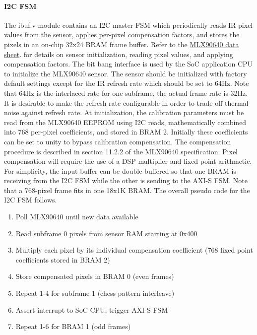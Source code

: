 \paragraph{I2C FSM}
The ibuf.v module contains an I2C master FSM which periodically reads IR pixel
values from the sensor, applies per-pixel compensation factors, and stores the
pixels in an on-chip 32x24 BRAM frame buffer. Refer to the
\href{https://www.melexis.com/en/documents/documentation/datasheets/datasheet-mlx90640}{MLX90640 data sheet}.
for details on sensor initialization, reading pixel values, and applying
compensation factors.  The bit bang interface is used by the SoC application
CPU to initialize the MLX90640 sensor. The sensor should be initialized with
factory default settings except for the IR refresh rate which should be set to
64Hz. Note that 64Hz is the interlaced rate for one subframe, the actual frame
rate is 32Hz. It is desirable to make the refresh rate configurable in order to
trade off thermal noise against refresh rate. At initialization, the
calibration parameters must be read from the MLX90640 EEPROM using I2C reads,
mathematically combined into 768 per-pixel coefficients, and stored in BRAM 2.
Initially these coefficients can be set to unity to bypass calibration
compensation. The compensation procedure is described in section 11.2.2 of the
MLX90640 specification. Pixel compensation will require the use of a DSP
multiplier and fixed point arithmetic.
For simplicity, the input buffer can be double buffered so that one BRAM is
receiving from the I2C FSM while the other is sending to the AXI-S FSM. Note
that a 768-pixel frame fits in one 18x1K BRAM. The overall pseudo code for the
I2C FSM follows.
\begin{enumerate}[noitemsep] %
\item	Poll MLX90640 until new data available
\item	Read subframe 0 pixels from sensor RAM starting at 0x400
\item	Multiply each pixel by its individual compensation coefficient (768 fixed point coefficients stored in BRAM 2)
\item	Store compensated pixels in BRAM 0 (even frames)
\item	Repeat 1-4 for subframe 1 (chess pattern interleave)
\item	Assert interrupt to SoC CPU, trigger AXI-S FSM
\item	Repeat 1-6 for BRAM 1 (odd frames)
\end{enumerate}

